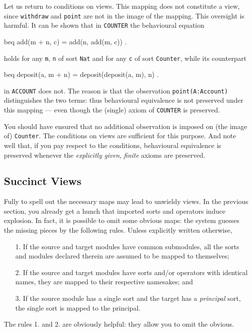 \documentclass[a4paper]{memoir}
\begin{document}
Let us return to conditions on views. This mapping does not
constitute a view, since
\verb|withdraw| and \verb|point| are not in the image of the
mapping. This oversight is harmful. It can be shown that in
\verb|COUNTER| the behavioural equation
\begin{vvtm}
\begin{ccode}
  beq add(m + n, c) = add(n, add(m, c)) .
\end{ccode}
\end{vvtm}
holds for any \verb|m|, \verb|n| of sort \verb|Nat| and for any
\verb|c| of sort \verb|Counter|, while its counterpart
\begin{vvtm}
\begin{ccode}
  beq deposit(a, m + n) = deposit(deposit(a, m), n) .
\end{ccode}
\end{vvtm}
in \verb|ACCOUNT| does not. The reason is that the observation
\verb|point(A:Account)| distinguishes the two terms:
thus behavioural equivalence is not preserved under this mapping ---
even though the (single) axiom of \verb|COUNTER| is preserved.

You should have ensured that no additional observation is imposed on
(the image of) \verb|Counter|. The conditions on views are sufficient
for this purpose. And note well that, if you pay respect to the
conditions, behavioural equivalence is preserved whenever
the {\em explicitly given}, {\em finite} axioms are preserved.

\subsection{Succinct Views}\label{sec:p2-succinct-view}

Fully to spell out the necessary maps may lead to unwieldy views.
In the previous section, you already get a hunch that imported sorts and
operators induce explosion. In fact,
it is possible to omit some obvious maps: the system guesses the
missing pieces by the following rules. Unless explicitly written
otherwise,
\begin{itemize}
\item[1.] If the source and target modules have common submodules,
  all the sorts and modules declared therein are assumed to
  be mapped to themselves;
\item[2.] If the source and target modules have sorts and/or operators
  with identical names, they are mapped to their respective namesakes; and
\item[3.] If the source module has a single sort and the target has
  a {\em principal} sort, the single sort is
  mapped to the principal.
\end{itemize}
The rules 1. and 2. are obviously helpful: they allow you to omit the obvious.
\end{document}
